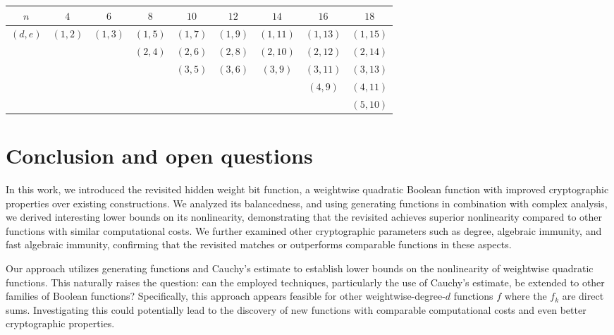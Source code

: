 \documentclass{llncs}
\begin{document}
\begin{table}
	\scriptsize
	\centering
	\begin{tabular}{|c|c|c|c|c|c|c|c|c|}
		\hline
		$ n $      & $4$     & $6$     & $8$     & $10$    & $12$    & $14$    & $16$    & $18$    \\
		\hline
		$(d, e)$ & $(1,2)$ & $(1,3)$ & $(1,5)$  & $(1,7)$ & $(1,9)$ & $(1,11)$ & $(1,13)$ & $(1,15)$ \\ 
		&     &    & $(2,4)$  & $(2,6)$ & $(2,8)$ & $(2,10)$ & $(2,12)$ & $(2,14)$\\ 
		&     &    &     & $(3,5)$ & $(3,6)$ & $(3,9)$ & $(3,11)$ & $(3,13)$\\ 
		&     &    &     &  &  &  & $(4,9)$ & $(4,11)$\\ 
	 	&     &    &     &  &  &  &  & $(5,10)$ \\
		\hline
	\end{tabular}
	\label{table:FAI}
\end{table}

\section{Conclusion and open questions}

In this work, we introduced the revisited hidden weight bit function, a weightwise quadratic Boolean function with improved cryptographic properties over existing constructions. We analyzed its balancedness, and using generating functions in combination with complex analysis, we derived interesting lower bounds on its nonlinearity, demonstrating that the revisited \hwbf{} achieves superior nonlinearity compared to other functions with similar computational costs. We further examined other cryptographic parameters such as degree, algebraic immunity, and fast algebraic immunity, confirming that the revisited \hwbf{} matches or outperforms comparable functions in these aspects.

Our approach utilizes generating functions and Cauchy’s estimate to establish lower bounds on the nonlinearity of weightwise quadratic functions. This naturally raises the question: can the employed techniques, particularly the use of Cauchy’s estimate, be extended to other families of Boolean functions? Specifically, this approach appears feasible for other weightwise-degree-$d$ functions $f$ where the $f_k$ are direct sums. Investigating this could potentially lead to the discovery of new functions with comparable computational costs and even better cryptographic properties.
\end{document}
